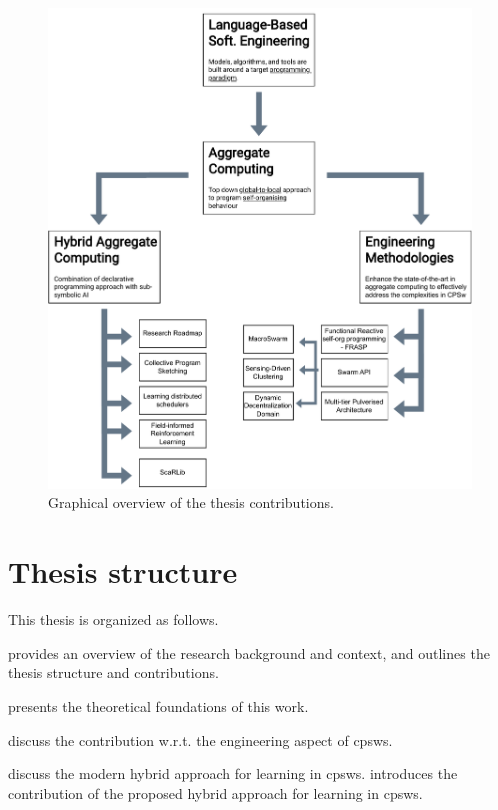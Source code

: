 \begin{refsection}
\begin{figure}
    \includegraphics[width=\textwidth]{chapters/img/contribution-visual.drawio.pdf}
    \caption{Graphical overview of the thesis contributions.}
\end{figure}
\section{Thesis structure}
This thesis is organized as follows.

 provides an overview of the research background and context, 
 and outlines the thesis structure and contributions.

 presents the theoretical foundations of this work.

 discuss the contribution w.r.t. the engineering aspect of \acp{cpsw}.

 discuss the modern hybrid approach for learning in \acp{cpsw}.
 introduces the contribution of the proposed hybrid approach for learning in \acp{cpsw}.

\printbibliography[title=Reference,heading=bibintoc]
\end{refsection}
